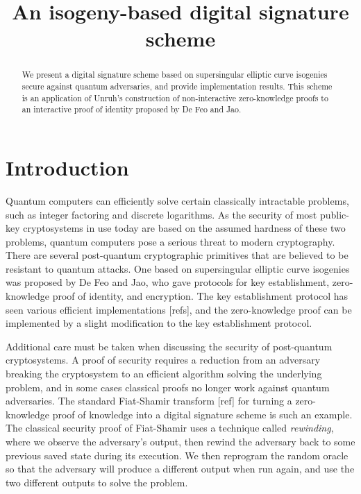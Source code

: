 \documentclass{amsart}
\theoremstyle{plain}
\theoremstyle{remark}
\numberwithin{equation}{section}
\begin{document}
\title{An isogeny-based digital signature scheme}



\begin{abstract}
We present a digital signature scheme based on supersingular elliptic curve isogenies secure against quantum adversaries, and provide implementation results. This scheme is an application of Unruh's construction of non-interactive zero-knowledge proofs to an interactive proof of identity proposed by De Feo and Jao.
\end{abstract}



\maketitle





\section{Introduction}

Quantum computers can efficiently solve certain classically intractable problems, such as integer factoring and discrete logarithms. As the security of most public-key cryptosystems in use today are based on the assumed hardness of these two problems, quantum computers pose a serious threat to modern cryptography.  There are several post-quantum cryptographic primitives that are believed to be resistant to quantum attacks. One based on supersingular elliptic curve isogenies was proposed by De Feo and Jao, who gave protocols for key establishment, zero-knowledge proof of identity, and encryption. The key establishment protocol has seen various efficient implementations [refs], and the zero-knowledge proof can be implemented by a slight modification to the key establishment protocol.

Additional care must be taken when discussing the security of post-quantum cryptosystems. A proof of security requires a reduction from an adversary breaking the cryptosystem to an efficient algorithm solving the underlying problem, and in some cases classical proofs no longer work against quantum adversaries. The standard Fiat-Shamir transform [ref] for turning a zero-knowledge proof of knowledge into a digital signature scheme is such an example. The classical security proof of Fiat-Shamir uses a technique called \emph{rewinding}, where we observe the adversary's output, then rewind the adversary back to some previous saved state during its execution. We then reprogram the random oracle so that the adversary will produce a different output when run again, and use the two different outputs to solve the problem.
\end{document}
